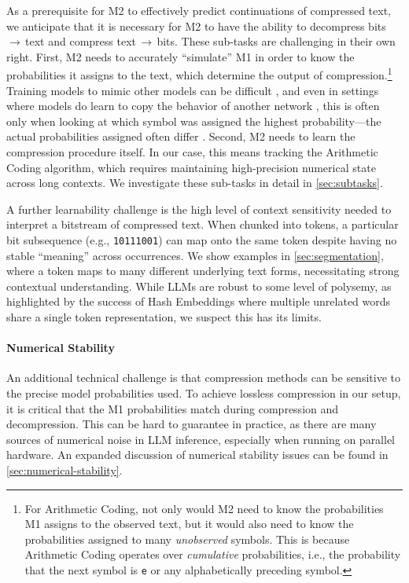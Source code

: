 As a prerequisite for M2 to effectively predict continuations of compressed text, we anticipate that it is necessary for M2 to have the ability to decompress bits\,$\rightarrow$\,text and compress text\,$\rightarrow$\,bits. These sub-tasks are challenging in their own right. First, M2 needs to accurately ``simulate'' M1 in order to know the probabilities it assigns to the text, which determine the output of compression.\footnote{For Arithmetic Coding, not only would M2 need to know the probabilities M1 assigns to the observed text, but it would also need to know the probabilities assigned to many \emph{unobserved} symbols. This is because Arithmetic Coding operates over \emph{cumulative} probabilities, i.e., the probability that the next symbol is \texttt{e} or any alphabetically preceding symbol.} Training models to mimic other models can be difficult \cite{lester-etal-2022-recycling}, and even in settings where models do learn to copy the behavior of another network \cite{hintonDistillingKnowledgeNeural2015}, this is often only when looking at which symbol was assigned the highest probability---the actual probabilities assigned often differ \cite{stantonDoesKnowledgeDistillation2021}. Second, M2 needs to learn the compression procedure itself. In our case, this means tracking the Arithmetic Coding algorithm, which requires maintaining high-precision numerical state across long contexts. We investigate these sub-tasks in detail in \ref{sec:subtasks}.

A further learnability challenge is the high level of context sensitivity needed to interpret a bitstream of compressed text. When chunked into tokens, a particular bit subsequence (e.g., \texttt{10111001}) can map onto the same token despite having no stable ``meaning'' across occurrences. We show examples in \ref{sec:segmentation}, where a token maps to many different underlying text forms, necessitating strong contextual understanding. While LLMs are robust to some level of polysemy, as highlighted by the success of Hash Embeddings \cite{titosvenstrupHashEmbeddingsEfficient2017} where multiple unrelated words share a single token representation, we suspect this has its limits.

\paragraph{Numerical Stability} An additional technical challenge is that compression methods can be sensitive to the precise model probabilities used. To achieve lossless compression in our setup, it is critical that the M1 probabilities match during compression and decompression. This can be hard to guarantee in practice, as there are many sources of numerical noise in LLM inference, especially when running on parallel hardware. An expanded discussion of numerical stability issues can be found in \ref{sec:numerical-stability}.

